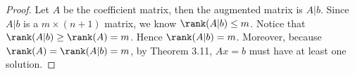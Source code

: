 \begin{Exercise}
	\begin{proof}
		Let $A$ be the coefficient matrix, then the augmented matrix is $A|b$. Since $A|b$ is a $m\times (n+1)$ matrix, we know $\rank(A|b) \leq m$. Notice that $\rank(A|b) \geq \rank(A) = m$. Hence $\rank(A|b) = m$. Moreover, because $\rank(A) = \rank(A|b) = m$, by Theorem 3.11, $Ax = b$ must have at least one solution.
	\end{proof}
\end{Exercise}